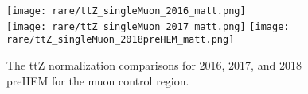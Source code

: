 \begin{figure}[!h]
	\begin{center}
  \texttt{[image: rare/ttZ\_singleMuon\_2016\_matt.png]} \\
  \texttt{[image: rare/ttZ\_singleMuon\_2017\_matt.png]} 
  \texttt{[image: rare/ttZ\_singleMuon\_2018preHEM\_matt.png]}

	\end{center}
	\caption[ttZ Normalization Comparisons]{The ttZ normalization comparisons for 2016, 2017, and 2018 preHEM for the muon control region.
	 }
	\label{fig:rare-norm-comp}
\end{figure}
